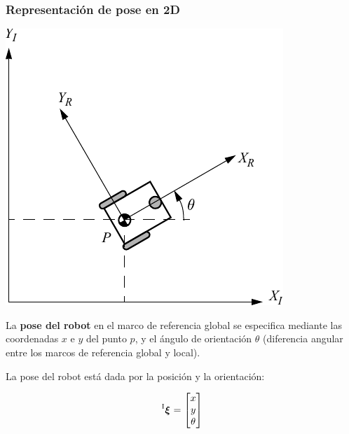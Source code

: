 \begin{frame}
    \frametitle{Representación de pose en 2D}

    \begin{center}
        \includegraphics[width=0.2\columnwidth]{./images/coordinate_systems.pdf}
    \end{center}
    
    La {\bf pose del robot} en el marco de referencia global se especifica mediante las coordenadas $x$ e $y$ del punto $p$, y el ángulo de orientación $\theta$ (diferencia angular entre los marcos de referencia global y local).

    La pose del robot está dada por la posición y la orientación:

    \begin{equation*}
        \prescript{\mathrm{I}}{}{{\boldsymbol{\mathbf{\xi}}}_\mathrm{}} =
        \begin{bmatrix}
            x\\
            y\\
            \theta
        \end{bmatrix}
    \end{equation*}
\end{frame}


